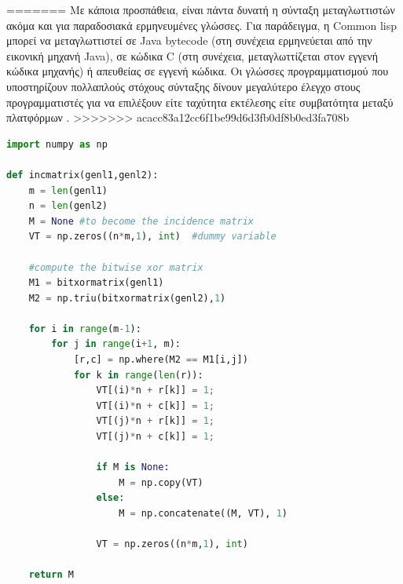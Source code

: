 \clearpage
=======
Με κάποια προσπάθεια, είναι πάντα δυνατή η σύνταξη μεταγλωττιστών ακόμα και για παραδοσιακά ερμηνευμένες γλώσσες. Για παράδειγμα, η Common lisp μπορεί να μεταγλωττιστεί σε Java bytecode (στη συνέχεια ερμηνεύεται από την εικονική μηχανή Java), σε κώδικα C (στη συνέχεια, μεταγλωττίζεται στον εγγενή κώδικα μηχανής) ή απευθείας σε εγγενή κώδικα. Οι γλώσσες προγραμματισμού που υποστηρίζουν πολλαπλούς στόχους σύνταξης δίνουν μεγαλύτερο έλεγχο στους προγραμματιστές για να επιλέξουν είτε ταχύτητα εκτέλεσης είτε συμβατότητα μεταξύ πλατφόρμων \cite{[SQA+07]}.
>>>>>>> acacc83a12cc6f1be99d6d3fb0df8b0ed3fa708b

\begin{lstlisting}[language=Python, caption=\selectlanguage{greek}Παράδειγμα κώδικα σε \selectlanguage{english}Python]
import numpy as np
 
def incmatrix(genl1,genl2):
    m = len(genl1)
    n = len(genl2)
    M = None #to become the incidence matrix
    VT = np.zeros((n*m,1), int)  #dummy variable
 
    #compute the bitwise xor matrix
    M1 = bitxormatrix(genl1)
    M2 = np.triu(bitxormatrix(genl2),1) 
 
    for i in range(m-1):
        for j in range(i+1, m):
            [r,c] = np.where(M2 == M1[i,j])
            for k in range(len(r)):
                VT[(i)*n + r[k]] = 1;
                VT[(i)*n + c[k]] = 1;
                VT[(j)*n + r[k]] = 1;
                VT[(j)*n + c[k]] = 1;
 
                if M is None:
                    M = np.copy(VT)
                else:
                    M = np.concatenate((M, VT), 1)
 
                VT = np.zeros((n*m,1), int)
 
    return M
\end{lstlisting}

